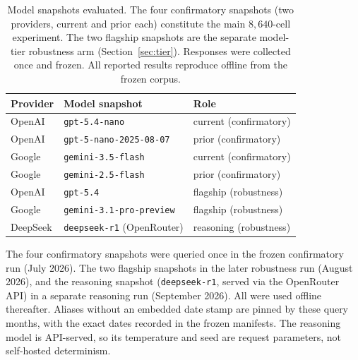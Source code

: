 \documentclass[a4paper,fleqn]{cas-sc}
\begin{document}
\begin{table}[t]\centering
\caption{Model snapshots evaluated. The four confirmatory snapshots (two providers, current and prior
each) constitute the main $8{,}640$-cell experiment. The two flagship snapshots are the separate
model-tier robustness arm (Section~\ref{sec:tier}). Responses were collected once and frozen. All
reported results reproduce offline from the frozen corpus.}\label{tab:models}
\begin{tabular}{lll}\toprule
Provider & Model snapshot & Role \\\midrule
OpenAI & \texttt{gpt-5.4-nano} & current (confirmatory) \\
OpenAI & \texttt{gpt-5-nano-2025-08-07} & prior (confirmatory) \\
Google & \texttt{gemini-3.5-flash} & current (confirmatory) \\
Google & \texttt{gemini-2.5-flash} & prior (confirmatory) \\\midrule
OpenAI & \texttt{gpt-5.4} & flagship (robustness) \\
Google & \texttt{gemini-3.1-pro-preview} & flagship (robustness) \\
DeepSeek & \texttt{deepseek-r1} (OpenRouter) & reasoning (robustness) \\\bottomrule
\end{tabular}

\vspace{3pt}
{\footnotesize\raggedright The four confirmatory snapshots were queried once in the frozen
confirmatory run (July 2026). The two flagship snapshots in the later robustness run (August 2026), and the reasoning
snapshot (\texttt{deepseek-r1}, served via the OpenRouter API) in a separate reasoning run (September 2026). All were
used offline thereafter. Aliases without an embedded date stamp are pinned by these query months, with the exact dates recorded in the frozen manifests. The
reasoning model is API-served, so its temperature and seed are request parameters, not self-hosted determinism.}
\end{table}
\end{document}
